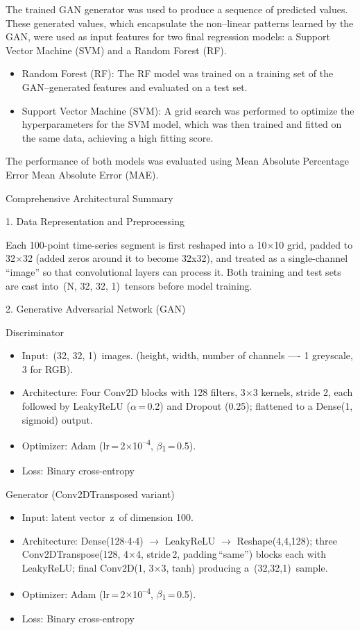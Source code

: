 \documentclass[12pt,a4paper]{report}
\numberwithin{equation}{section}
\begin{document}
The trained GAN generator was used to produce a sequence of predicted
values. These generated values, which encapsulate the non--linear
patterns learned by the GAN, were used as input features for two final
regression models: a Support Vector Machine (SVM) and a Random Forest
(RF).

\begin{itemize}
\item
  Random Forest (RF): The RF model was trained on a training set of the
  GAN--generated features and evaluated on a test set.
\item
  Support Vector Machine (SVM): A grid search was performed to optimize
  the hyperparameters for the SVM model, which was then trained and
  fitted on the same data, achieving a high fitting score.
\end{itemize}

The performance of both models was evaluated using Mean Absolute
Percentage Error Mean Absolute Error (MAE).

Comprehensive Architectural Summary

1. Data Representation and Preprocessing

Each 100-point time-series segment is first reshaped into a 10$\times$10 grid,
padded to 32$\times$32 (added zeros around it to become 32x32), and treated as
a single-channel ``image'' so that convolutional layers can process it.
Both training and test sets are cast into~(N, 32, 32, 1)~tensors before
model training.

2. Generative Adversarial Network (GAN)

Discriminator

\begin{itemize}
\item
  Input:~(32, 32, 1)~images. (height, width, number of channels ---- 1
  greyscale, 3 for RGB).
\item
  Architecture: Four Conv2D blocks with 128 filters, 3$\times$3 kernels, stride
  2, each followed by LeakyReLU ($\alpha$\,=\,0.2) and Dropout (0.25);
  flattened to a Dense(1, sigmoid) output.
\item
  Optimizer: Adam (lr\,=\,2$\times$10\textsuperscript{--4}, $\beta$\textsubscript{1}\,=\,0.5).
\item
  Loss: Binary cross-entropy
\end{itemize}

Generator (Conv2DTransposed variant)

\begin{itemize}
\item
  Input: latent vector~z~of dimension 100.
\item
  Architecture: Dense(128$\cdot$4$\cdot$4) $\rightarrow$ LeakyReLU $\rightarrow$ Reshape(4,4,128); three
  Conv2DTranspose(128, 4$\times$4, stride\,2, padding\,``same'') blocks each
  with LeakyReLU; final Conv2D(1, 3$\times$3, tanh) producing
  a~(32,32,1)~sample.
\item
  Optimizer: Adam (lr\,=\,2$\times$10\textsuperscript{--4}, $\beta$\textsubscript{1}\,=\,0.5).
\item
  Loss: Binary cross-entropy
\end{itemize}
\end{document}
